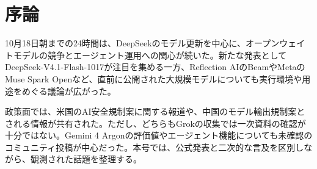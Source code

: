 \section*{序論}
10月18日朝までの24時間は、DeepSeekのモデル更新を中心に、オープンウェイトモデルの競争とエージェント運用への関心が続いた。新たな発表としてDeepSeek-V4.1-Flash-1017が注目を集める一方、Reflection AIのBeamやMetaのMuse Spark Openなど、直前に公開された大規模モデルについても実行環境や用途をめぐる議論が広がった。

政策面では、米国のAI安全規制案に関する報道や、中国のモデル輸出規制案とされる情報が共有された。ただし、どちらもGrokの収集では一次資料の確認が十分ではない。Gemini 4 Argonの評価値やエージェント機能についても未確認のコミュニティ投稿が中心だった。本号では、公式発表と二次的な言及を区別しながら、観測された話題を整理する。
